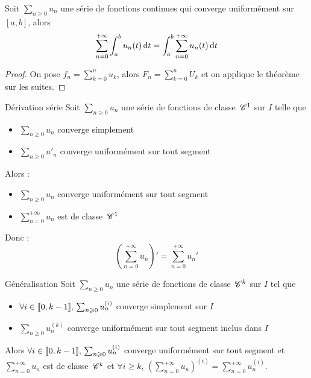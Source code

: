 \begin{corollaire}{}{}
    Soit $\sum_{n \geqslant 0} u_n$ une série de fonctions continues qui converge uniformément sur 
    $[a, b]$, alors 
    $$\sum_{n = 0}^{+ \infty} \int_{a}^{b} u_n(t) \,\mathrm{d}t = \int_{a}^{b} \sum_{n = 0}^{+ \infty} u_n(t) \,\mathrm{d}t$$
\end{corollaire}

\begin{proof}
    On pose $\displaystyle f_n = \sum_{k = 0}^n u_k$, alors $\displaystyle F_n = \sum_{k = 0 }^{n } U_k$ et on applique le 
    théorème sur les suites. 
\end{proof}

\begin{theoreme}{Dérivation série}{}
    Soit $\sum_{n \geqslant 0} u_n$ une série de fonctions de classe $\,\mathscr C^{1}$ sur $I$ telle que
    \begin{itemize}
        \item $\sum_{n \geqslant 0} u_n$ converge simplement
        \item $\sum_{n \geqslant 0} u'_n$ converge uniformément sur tout segment
    \end{itemize}
    Alors : 
    \begin{itemize}
        \item $\sum_{n \geqslant 0} u_n$ converge uniformément sur tout segment
        \item $\displaystyle \sum_{n = 0 }^{+ \infty } u_n$ est de classe $\,\mathscr C^{1}$
    \end{itemize}
    Donc : 
    $$\left(\sum_{n = 0}^{+ \infty} u_n\right)' = \sum_{n = 0 }^{+ \infty } u_n'$$
\end{theoreme}

\begin{theoreme}{Généralisation}{}
    Soit $\sum_{n \geqslant 0} u_n$ une série de fonctions de classe $\,\mathscr C^{k}$ sur $I$ tel que 
    \begin{itemize}
        \item $\forall i \in [\![0, k - 1]\!], \, \sum_{n \geqslant 0} u_n^{(i)}$ converge simplement sur $I$ 
        \item $\sum_{n \geqslant 0} u_n^{(k)}$ converge uniformément sur tout segment inclus dans $I$   
    \end{itemize}

    Alors $\forall i \in [\![0, k - 1]\!], \, \sum_{n \geqslant 0} u_n^{(i)}$ converge uniformément sur tout segment
    et $\displaystyle \sum_{n = 0}^{+ \infty} u_n$ est de classe $\,\mathscr C^{k}$ et 
    $\forall i \geqslant k$, $\displaystyle \left( \sum_{n = 0}^{+ \infty} u_n \right)^{(i)} = \sum_{n = 0}^{+ \infty} u_n^{(i)}$.
\end{theoreme}

